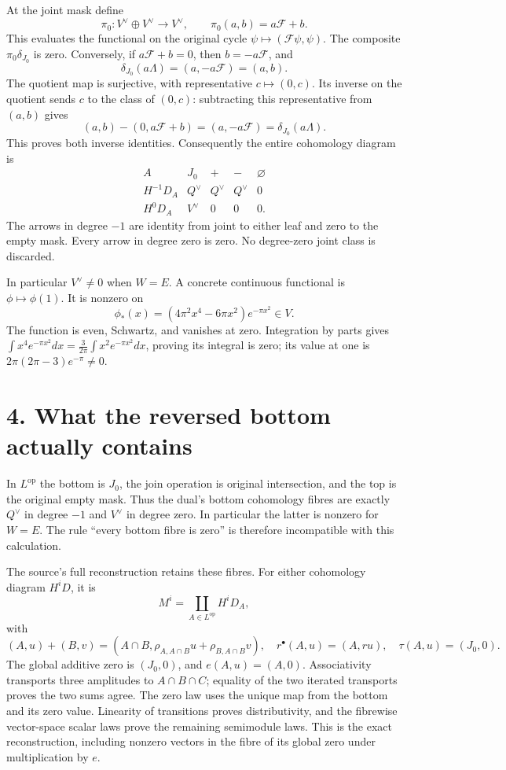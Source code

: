 At the joint mask define \[
\pi_0:V^\vee\oplus V^\vee\longrightarrow V^\vee,
\qquad\pi_0(a,b)=a\mathcal F+b.
\] This evaluates the functional on the original cycle
\(\psi\mapsto(\mathcal F\psi,\psi)\). The composite
\(\pi_0\delta_{J_0}\) is zero. Conversely, if \(a\mathcal F+b=0\), then
\(b=-a\mathcal F\), and \[
\delta_{J_0}(a\Lambda)=(a,-a\mathcal F)=(a,b).
\] The quotient map is surjective, with representative
\(c\mapsto(0,c)\). Its inverse on the quotient sends \(c\) to the class
of \((0,c)\): subtracting this representative from \((a,b)\) gives \[
(a,b)-(0,a\mathcal F+b)=(a,-a\mathcal F)=\delta_{J_0}(a\Lambda).
\] This proves both inverse identities. Consequently the entire
cohomology diagram is \[
\begin{array}{c|cccc}
A&J_0&+&-&\varnothing\\ \hline
H^{-1}D_A&Q^\vee&Q^\vee&Q^\vee&0\\
H^0D_A&V^\vee&0&0&0.
\end{array}
\] The arrows in degree \(-1\) are identity from joint to either leaf
and zero to the empty mask. Every arrow in degree zero is zero. No
degree-zero joint class is discarded.

In particular \(V^\vee\ne0\) when \(W=E\). A concrete continuous
functional is \(\phi\mapsto\phi(1)\). It is nonzero on \[
\phi_*(x)=(4\pi^2x^4-6\pi x^2)e^{-\pi x^2}\in V.
\] The function is even, Schwartz, and vanishes at zero. Integration by
parts gives
\(\int x^4e^{-\pi x^2}dx=\frac{3}{2\pi}\int x^2e^{-\pi x^2}dx\), proving
its integral is zero; its value at one is \(2\pi(2\pi-3)e^{-\pi}\ne0\).

\section{4. What the reversed bottom actually
contains}\label{what-the-reversed-bottom-actually-contains}

In \(L^{\mathrm{op}}\) the bottom is \(J_0\), the join operation is
original intersection, and the top is the original empty mask. Thus the
dual's bottom cohomology fibres are exactly \(Q^\vee\) in degree \(-1\)
and \(V^\vee\) in degree zero. In particular the latter is nonzero for
\(W=E\). The rule ``every bottom fibre is zero'' is therefore
incompatible with this calculation.

The source's full reconstruction retains these fibres. For either
cohomology diagram \(H^iD\), it is \[
M^i=\coprod_{A\in L^{\mathrm{op}}}H^iD_A,
\] with \[
(A,u)+(B,v)=
(A\cap B,\rho_{A,A\cap B}u+\rho_{B,A\cap B}v),
\quad
r^\bullet(A,u)=(A,ru),
\quad
\tau(A,u)=(J_0,0).
\] The global additive zero is \((J_0,0)\), and \(e(A,u)=(A,0)\).
Associativity transports three amplitudes to \(A\cap B\cap C\); equality
of the two iterated transports proves the two sums agree. The zero law
uses the unique map from the bottom and its zero value. Linearity of
transitions proves distributivity, and the fibrewise vector-space scalar
laws prove the remaining semimodule laws. This is the exact
reconstruction, including nonzero vectors in the fibre of its global
zero under multiplication by \(e\).

